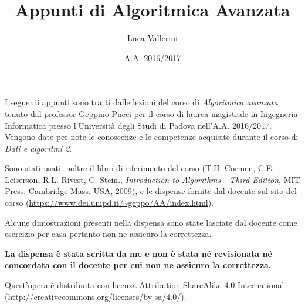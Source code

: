 \documentclass[a4paper,openright]{report}
\title{Appunti di Algoritmica Avanzata}
\author{Luca Vallerini}
\date{A.A. 2016/2017}
\begin{document}
\maketitle

\chapter*{}
\thispagestyle{empty}
I seguenti appunti sono tratti dalle lezioni del corso di \textit{Algoritmica avanzata} tenuto dal professor Geppino Pucci per il corso di laurea magistrale in Ingegneria Informatica presso l'Università degli Studi di Padova nell'A.A. 2016/2017. Vengono date per note le conoscenze e le competenze acquisite durante il corso di \textit{Dati e algoritmi 2}.

Sono stati usati inoltre il libro di riferimento del corso (T.H. Cormen, C.E. Leiserson, R.L. Rivest, C. Stein., \textit{Introduction to Algorithms - Third Edition}, MIT Press, Cambridge Mass. USA, 2009), e le dispense fornite dal docente sul sito del corso (\url{https://www.dei.unipd.it/~geppo/AA/index.html}).

Alcune dimostrazioni presenti nella dispensa sono state lasciate dal docente come esercizio per casa pertanto non ne assicuro la correttezza.

\textbf{La dispensa è stata scritta da me e non è stata né revisionata né concordata con il docente per cui non ne assicuro la correttezza.}

\vfill

Quest'opera è distribuita con licenza Attribution-ShareAlike 4.0 International (\url{http://creativecommons.org/licenses/by-sa/4.0/}).

\setcounter{page}{0}
\tableofcontents
\listofalgorithms








\end{document}
